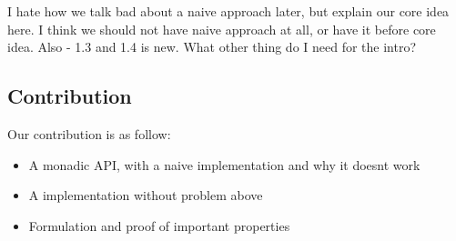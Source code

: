 \pavel I hate how we talk bad about a naive approach later, but explain our core idea here. I think we should not have naive approach at all, or have it before core idea. Also - 1.3 and 1.4 is new. What other thing do I need for the intro?

\subsection{Contribution}
Our contribution is as follow:
\begin{itemize}
	\item A monadic API, with a naive implementation and why it doesnt work
	\item A implementation without problem above
	\item Formulation and proof of important properties
\end{itemize}